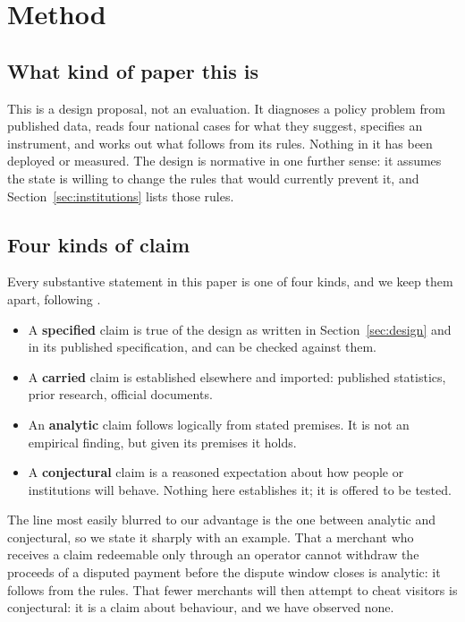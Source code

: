 \documentclass[10pt,letterpaper,twocolumn]{article}
\begin{document}
\section{Method}
\label{sec:method}

\subsection{What kind of paper this is}

This is a design proposal, not an evaluation. It diagnoses a policy problem
from published data, reads four national cases for what they suggest, specifies
an instrument, and works out what follows from its rules. Nothing in it has
been deployed or measured. The design is normative in one further sense: it
assumes the state is willing to change the rules that would currently prevent
it, and Section~\ref{sec:institutions} lists those rules.

\subsection{Four kinds of claim}

Every substantive statement in this paper is one of four kinds, and we keep
them apart, following \citet{chay2026precinct}.

\begin{itemize}
  \item A \textbf{specified} claim is true of the design as written in
  Section~\ref{sec:design} and in its published specification, and can be
  checked against them.
  \item A \textbf{carried} claim is established elsewhere and imported:
  published statistics, prior research, official documents.
  \item An \textbf{analytic} claim follows logically from stated premises. It
  is not an empirical finding, but given its premises it holds.
  \item A \textbf{conjectural} claim is a reasoned expectation about how people
  or institutions will behave. Nothing here establishes it; it is offered to be
  tested.
\end{itemize}

The line most easily blurred to our advantage is the one between analytic and
conjectural, so we state it sharply with an example. That a merchant who
receives a claim redeemable only through an operator cannot withdraw the
proceeds of a disputed payment before the dispute window closes is analytic: it
follows from the rules. That fewer merchants will then attempt to cheat visitors
is conjectural: it is a claim about behaviour, and we have observed none.
\end{document}
